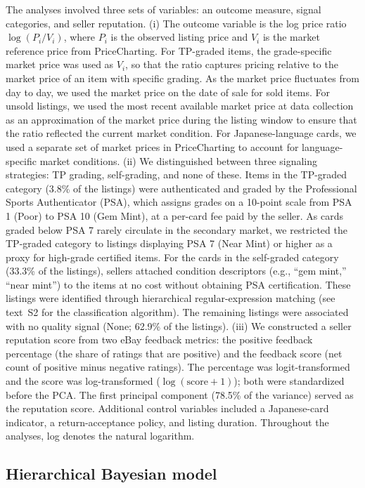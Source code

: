 \documentclass[11pt,letterpaper]{article}
\theoremstyle{definition}
\begin{document}
The analyses involved three sets of variables: an outcome measure, signal categories, and seller reputation. (i) The outcome variable is the log price ratio $\log(P_i / V_i)$, where $P_i$ is the observed listing price and $V_i$ is the market reference price from PriceCharting. For TP-graded items, the grade-specific market price was used as $V_i$, so that the ratio captures pricing relative to the market price of an item with specific grading. As the market price fluctuates from day to day, we used the market price on the date of sale for sold items. For unsold listings, we used the most recent available market price at data collection as an approximation of the market price during the listing window to ensure that the ratio reflected the current market condition. For Japanese-language cards, we used a separate set of market prices in PriceCharting to account for language-specific market conditions. (ii) We distinguished between three signaling strategies: TP grading, self-grading, and none of these. Items in the TP-graded category (3.8\% of the listings) were authenticated and graded by the Professional Sports Authenticator (PSA), which assigns grades on a 10-point scale from PSA 1 (Poor) to PSA 10 (Gem Mint), at a per-card fee paid by the seller. As cards graded below PSA 7 rarely circulate in the secondary market, we restricted the TP-graded category to listings displaying PSA 7 (Near Mint) or higher as a proxy for high-grade certified items. For the cards in the self-graded category (33.3\% of the listings), sellers attached condition descriptors (e.g., ``gem mint,'' ``near mint'') to the items at no cost without obtaining PSA certification. These listings were identified through hierarchical regular-expression matching (see text~S2 for the classification algorithm). The remaining listings were associated with no quality signal (None; 62.9\% of the listings). (iii) We constructed a seller reputation score from two eBay feedback metrics: the positive feedback percentage (the share of ratings that are positive) and the feedback score (net count of positive minus negative ratings). The percentage was logit-transformed and the score was log-transformed ($\log(\text{score} + 1)$); both were standardized before the PCA. The first principal component (78.5\% of the variance) served as the reputation score. Additional control variables included a Japanese-card indicator, a return-acceptance policy, and listing duration. Throughout the analyses, log denotes the natural logarithm.

\subsection*{Hierarchical Bayesian model}
\end{document}
